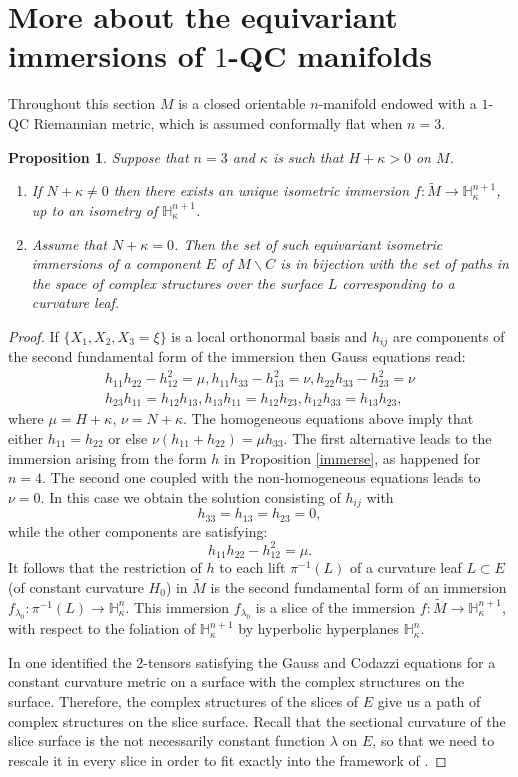 \documentclass[JEP,XML,SOM,Unicode]{cedram}
\let\moins\smallsetminus
\newtheorem{proposition}[theorem]{Proposition}
\theoremstyle{definition}
\theoremstyle{remark}
\numberwithin{equation}{section}
\begin{document}
\section{More about the equivariant immersions of \texorpdfstring{$1$}{1}-QC manifolds}\label{sec:5}
Throughout this section $M$ is a closed orientable $n$-manifold endowed with a $1$-QC Riemannian metric, which is assumed
conformally flat when $n=3$.
\begin{proposition}\label{immerse3}
Suppose that $n=3$ and $\kappa$ is such that $H+\kappa >0$ on $M$.
\begin{enumerate}
\item If $N+\kappa\neq 0$ then there exists an unique isometric immersion
$f:\widetilde{M}\to \mathbb H_{\kappa}^{n+1}$, up
to an isometry of $\mathbb H_{\kappa}^{n+1}$.
\item Assume that $N+\kappa=0$. Then the set of such
equivariant isometric immersions of a component $E$ of $M\moins C$
is in bijection with the set of paths in the space of complex structures
over the surface $L$ corresponding to a curvature leaf.
\end{enumerate}
\end{proposition}
\begin{proof}
If $\{X_1,X_2,X_3=\xi\}$ is a local orthonormal basis and $h_{ij}$ are components of the second fundamental form of the immersion then Gauss equations read:
\begin{gather*}
h_{11}h_{22}-h_{12}^2=\mu,
h_{11}h_{33}-h_{13}^2=\nu, h_{22}h_{33}-h_{23}^2=\nu\\
h_{23}h_{11}=h_{12}h_{13}, h_{13}h_{11}=h_{12}h_{23},
h_{12}h_{33}=h_{13}h_{23},
\end{gather*}
where $\mu=H+\kappa$, $\nu=N+\kappa$.
The homogeneous equations above imply that
either $h_{11}=h_{22}$ or else $\nu(h_{11}+h_{22})=\mu h_{33}$.
The first alternative leads to the immersion arising from the
form $h$ in Proposition \ref{immerse}, as happened for $n=4$.
The second one coupled with the non-homogeneous equations
leads to $\nu=0$. In this case we obtain the solution consisting of
$h_{ij}$ with
\[ h_{33}=h_{13}=h_{23}=0,\]
while the other components are satisfying:
\[h_{11}h_{22}-h_{12}^2=\mu.\]
It follows that the restriction of $h$ to each lift $\pi^{-1}(L)$
of a curvature leaf $L\subset E$ (of constant curvature $H_0$)
in $\widetilde{M}$ is the second fundamental form of
an immersion $f_{\lambda_0}:\pi^{-1}(L)\to \mathbb H_{\kappa}^n$.
This immersion $f_{\lambda_0}$ is a slice of the
immersion $f:\widetilde{M}\to \mathbb H_{\kappa}^{n+1}$,
with respect to the foliation of $\mathbb H_{\kappa}^{n+1}$ by
hyperbolic hyperplanes $\mathbb H_{\kappa}^n$.

In \cite[Prop.\,2.5]{Lab} one identified
the 2-tensors satisfying the Gauss and Codazzi equations for
a constant curvature metric on a surface with the complex structures on the surface. Therefore, the complex structures of the slices of $E$ give
us a path of complex structures on the slice surface.
Recall that the sectional curvature of the slice surface
is the not necessarily constant function $\lambda$ on $E$,
so that we need to rescale it in every slice in order to
fit exactly into the framework of \cite[Prop.\,2.5]{Lab}.
\end{proof}
\end{document}
